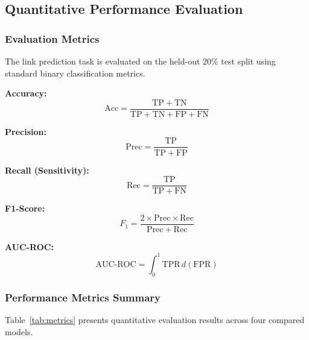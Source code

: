 \documentclass[conference]{IEEEtran}
\begin{document}
\subsection{Quantitative Performance Evaluation}

\subsubsection{Evaluation Metrics}
The link prediction task is evaluated on the held-out 20\% test
split using standard binary classification metrics.

\noindent\textbf{Accuracy:}
\begin{equation}
  \mathrm{Acc} =
    \frac{\mathrm{TP}+\mathrm{TN}}
         {\mathrm{TP}+\mathrm{TN}+\mathrm{FP}+\mathrm{FN}}
  \label{eq:acc}
\end{equation}

\noindent\textbf{Precision:}
\begin{equation}
  \mathrm{Prec} =
    \frac{\mathrm{TP}}{\mathrm{TP}+\mathrm{FP}}
  \label{eq:prec}
\end{equation}

\noindent\textbf{Recall (Sensitivity):}
\begin{equation}
  \mathrm{Rec} =
    \frac{\mathrm{TP}}{\mathrm{TP}+\mathrm{FN}}
  \label{eq:rec}
\end{equation}

\noindent\textbf{F1-Score:}
\begin{equation}
  F_1 = \frac{2\times\mathrm{Prec}\times\mathrm{Rec}}
             {\mathrm{Prec}+\mathrm{Rec}}
  \label{eq:f1}
\end{equation}

\noindent\textbf{AUC-ROC:}
\begin{equation}
  \mathrm{AUC\text{-}ROC} =
    \int_{0}^{1}\mathrm{TPR}\,d(\mathrm{FPR})
  \label{eq:auc}
\end{equation}

\subsubsection{Performance Metrics Summary}
Table~\ref{tab:metrics} presents quantitative evaluation results across
four compared models.
\end{document}
